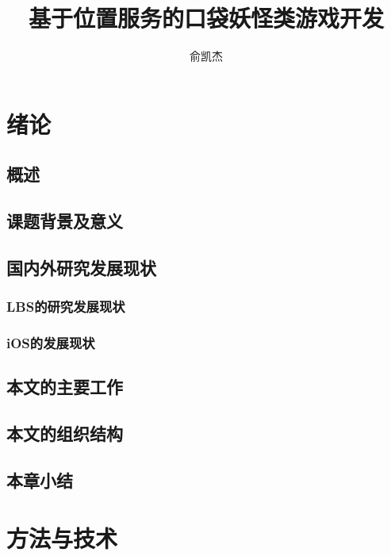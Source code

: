 \documentclass{article}
\title{基于位置服务的口袋妖怪类游戏开发}
\author{俞凯杰}
\begin{document}
\begin{CJK}{UTF8}{gbsn}
  \maketitle

  \renewcommand{\abstractname}{摘要}
	\renewcommand{\figurename}{图}
	\renewcommand{\refname}{参考文献}

	

  \begin{abstract}
  \end{abstract}

  \newpage
  \section{绪论}
	\subsection{概述}
	\subsection{课题背景及意义}
	\subsection{国内外研究发展现状}
	\subsubsection{LBS的研究发展现状}
	\subsubsection{iOS的发展现状}
	\subsection{本文的主要工作}
	\subsection{本文的组织结构}
	\subsection{本章小结}

	\section{方法与技术}

\end{CJK}
\end{document}
